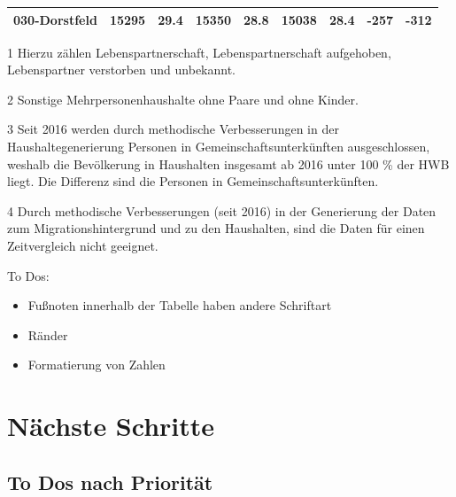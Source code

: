 \documentclass[
  a4paper,
  twoside]{article}
\providecommand{\tightlist}{%
  \setlength{\itemsep}{0pt}\setlength{\parskip}{0pt}}
\begin{document}
\begin{table}[!h]
{\begin{threeparttable}
\begin{tabular}[t]{>{}l>{}r>{}r>{}r>{}r>{}r>{}r>{}r>{}r}
\hspace{1em}\hspace{1em}\textcolor{DoGray}{030-Dorstfeld} & \textcolor{DoGray}{15295} & \textcolor{DoGray}{29.4} & \textcolor{DoGray}{15350} & \textcolor{DoGray}{28.8} & \textcolor{DoGray}{15038} & \textcolor{DoGray}{28.4} & \textcolor{DoGray}{-257} & \textcolor{DoGray}{-312}\\
\bottomrule
\end{tabular}
\begin{tablenotes}
\small
\item[1] \textcolor{DoGray}{Hierzu zählen Lebenspartnerschaft, Lebenspartnerschaft aufgehoben, Lebenspartner verstorben und unbekannt.}
\item[2] \textcolor{DoGray}{Sonstige Mehrpersonenhaushalte ohne Paare und ohne Kinder.}
\item[3] \textcolor{DoGray}{Seit 2016 werden durch methodische Verbesserungen in der Haushaltegenerierung Personen in Gemeinschaftsunterkünften ausgeschlossen, weshalb die Bevölkerung in Haushalten insgesamt ab 2016 unter 100 \% der HWB liegt. Die Differenz sind die Personen in Gemeinschaftsunterkünften.}
\item[4] \textcolor{DoGray}{Durch methodische Verbesserungen (seit 2016) in der Generierung der Daten zum Migrationshintergrund und zu den Haushalten, sind die Daten für einen Zeitvergleich nicht geeignet.}
\end{tablenotes}
\end{threeparttable}}
\end{table}

To Dos:

\begin{itemize}
\tightlist
\item
  Fußnoten innerhalb der Tabelle haben andere Schriftart
\item
  Ränder
\item
  Formatierung von Zahlen
\end{itemize}

\newpage

\hypertarget{nuxe4chste-schritte}{%
\section{Nächste Schritte}\label{nuxe4chste-schritte}}

\hypertarget{to-dos-nach-priorituxe4t}{%
\subsection{To Dos nach Priorität}\label{to-dos-nach-priorituxe4t}}
\end{document}
